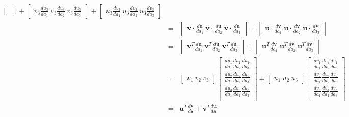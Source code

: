 \begin{eqnarray*}
\begin{bmatrix}
      \end{bmatrix}
      +
      \begin{bmatrix}
      \displaystyle v_3\frac{du_3}{da_1} \: v_3\frac{du_3}{da_2} \: v_3\frac{du_3}{da_3}
      \end{bmatrix}
      +
      \begin{bmatrix}
      \displaystyle u_3\frac{dv_3}{da_1} \: u_3\frac{dv_3}{da_2} \: u_3\frac{dv_3}{da_3}
      \end{bmatrix}
      \\
    &=& \begin{bmatrix}
      \displaystyle \mathbf{v}\cdot\frac{d\mathbf{u}}{da_1} \: \mathbf{v}\cdot\frac{d\mathbf{u}}{da_2} \: \mathbf{v}\cdot\frac{d\mathbf{u}}{da_3}
      \end{bmatrix}
      +
      \begin{bmatrix}
      \displaystyle \mathbf{u}\cdot\frac{d\mathbf{v}}{da_1} \: \mathbf{u}\cdot\frac{d\mathbf{v}}{da_2} \: \mathbf{u}\cdot\frac{d\mathbf{v}}{da_3}
      \end{bmatrix}\\
    &=&  
      \begin{bmatrix}
      \displaystyle \mathbf{v}^T\frac{d\mathbf{u}}{da_1} \: \mathbf{v}^T\frac{d\mathbf{u}}{da_2} \: \mathbf{v}^T\frac{d\mathbf{u}}{da_3}
      \end{bmatrix}
      +
      \begin{bmatrix}
      \displaystyle \mathbf{u}^T\frac{d\mathbf{v}}{da_1} \: \mathbf{u}^T\frac{d\mathbf{v}}{da_2} \: \mathbf{u}^T\frac{d\mathbf{v}}{da_3}
      \end{bmatrix}\\
    &=& 
      \begin{bmatrix}
      \displaystyle
      v_1 \: v_2 \: v_3
      \end{bmatrix}
      \begin{bmatrix}
      \displaystyle
      \frac{du_1}{da_1} \frac{du_1}{da_2} \frac{du_1}{da_3}\\
      \displaystyle
      \frac{du_2}{da_1} \frac{du_2}{da_2} \frac{du_2}{da_3}\\
      \displaystyle
      \frac{du_3}{da_1} \frac{du_3}{da_2} \frac{du_3}{da_3}\\
      \end{bmatrix} 
     +
      \begin{bmatrix}
      \displaystyle
      u_1 \: u_2 \: u_3
      \end{bmatrix}
      \begin{bmatrix}
      \displaystyle
      \frac{dv_1}{da_1} \frac{dv_1}{da_2} \frac{dv_1}{da_3}\\
      \displaystyle
      \frac{dv_2}{da_1} \frac{dv_2}{da_2} \frac{dv_2}{da_3}\\
      \displaystyle
      \frac{dv_3}{da_1} \frac{dv_3}{da_2} \frac{dv_3}{da_3}\\
      \end{bmatrix} \\
    &=& 
        \mathbf{u}^T\frac{d\mathbf{v}}{d\mathbf{a}} + \mathbf{v}^T\frac{d\mathbf{u}}{d\mathbf{a}}
\end{eqnarray*}

